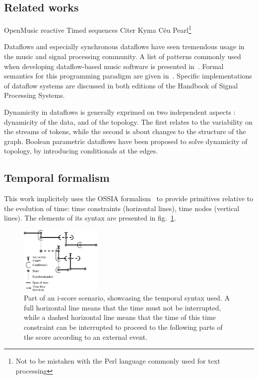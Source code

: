 \documentclass{article}
\begin{document}
\subsection{Related works}

OpenMusic reactive\cite{bresson:hal-00965747}
Timed sequences\cite{garcia:hal-01484077}
Citer Kyma\cite{scaletti1989kyma}
Céu\cite{sant2015structured}
Pearl\cite{halang2001safe}\footnote{Not to be mistaken with the Perl language commonly used for text processing}

Dataflows and especially synchronous dataflows have seen tremendous usage in the music and signal processing community. 
A list of patterns commonly used when developing dataflow-based music software is presented in~\cite{arumi2006dataflow}.
Formal semantics for this programming paradigm are given in~\cite{benveniste_data-flow_1993}.
Specific implementations of dataflow systems are discussed in both editions of the Handbook of Signal Processing Systems\cite{bhattacharyya_handbook_2013}. 

Dynamicity in dataflows is generally exprimed on two independent aspects : dynamicity of the data, and of the topology.
The first relates to the variability on the streams of tokens, while the second is about changes to the structure of the graph. 
Boolean parametric dataflows\cite{bempelis2015boolean} have been proposed to solve dynamicity of topology, by introducing conditionals at the edges.

\subsection{Temporal formalism}
This work implicitely uses the OSSIA formalism~\cite{celerier2015ossia} to provide primitives relative to the evolution of time: time constraints (horizontal lines), time nodes (vertical lines). 
The elements of its syntax are presented in fig.~\ref{fig.iscore-example}.
    
\begin{figure}[h]
  \centering
  \includegraphics[width=0.35\textwidth]{images/iscore-example.eps}
  \caption{Part of an i-score scenario, showcasing the temporal syntax used. 
    A full horizontal line means that the time must not be interrupted, 
    while a dashed horizontal line means that the time of this time constraint can be interrupted to proceed 
  to the following parts of the score according to an external event.}
  \label{fig.iscore-example}
\end{figure}
    
\end{document}
